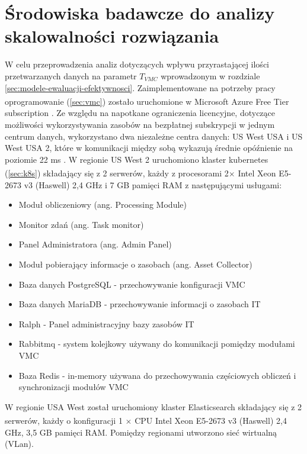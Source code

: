 
\section{Środowiska badawcze do analizy skalowalności rozwiązania}
\label{sec:desc_skalowalnosc}
W celu przeprowadzenia analiz dotyczących wpływu przyrastającej ilości przetwarzanych danych na parametr $T_{VMC}$ wprowadzonym w rozdziale \ref{sec:modele-ewaluacji-efektywnosci}. Zaimplementowane na potrzeby pracy oprogramowanie (\ref{sec:vmc}) zostało uruchomione w Microsoft Azure\textsuperscript{\textregistered} Free Tier subscription \cite{microsoft-fre-tier}. Ze względu na napotkane ograniczenia licencyjne, dotyczące możliwości wykorzystywania zasobów na bezpłatnej subskrypcji w jednym centrum danych, wykorzystano dwa niezależne centra danych: US West USA i US West USA 2, które w komunikacji między sobą wykazują średnie opóźnienie na poziomie 22 ms \cite{microsoft-latency}. W regionie US West 2 uruchomiono klaster kubernetes (\ref{sec:k8s}) składający się z 2 serwerów, każdy z procesorami 2$\times$ Intel Xeon\textsuperscript{\textregistered} E5-2673 v3 (Haswell) 2,4 GHz i 7 GB pamięci RAM z następującymi usługami:

\begin{itemize}
\item Moduł obliczeniowy (ang. Processing Module) 
\item Monitor zdań (ang. Task monitor)
\item Panel Administratora (ang. Admin Panel)
\item Moduł pobierający informacje o zasobach (ang. Asset Collector) 
\item Baza danych PostgreSQL \cite{postgresql1996postgresql} - przechowywanie konfiguracji VMC
\item Baza danych MariaDB \cite{bartholomew2012mariadb} - przechowywanie informacji o zasobach IT
\item Ralph \cite{ralph} - Panel administracyjny bazy zasobów IT
\item Rabbitmq \cite{johansson2020rabbitmq} - system kolejkowy używany do komunikacji pomiędzy modułami VMC
\item Baza Redis \cite{chen2016towards} - in-memory używana do przechowywania częściowych obliczeń i synchronizacji modułów VMC
\end{itemize}

\bigbreak
W regionie USA West został uruchomiony klaster Elasticsearch składający się z 2 serwerów, każdy o konfiguracji 1 $\times$ CPU Intel Xeon\textsuperscript{\textregistered} E5-2673 v3 (Haswell) 2,4 GHz, 3,5 GB pamięci RAM. Pomiędzy regionami utworzono sieć wirtualną (VLan).